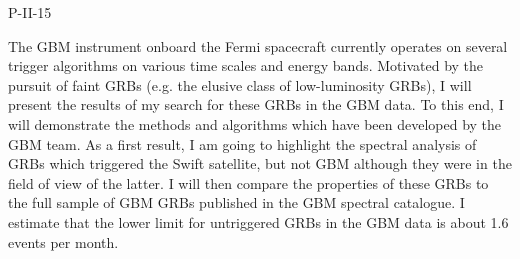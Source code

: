 P-II-15


\bigskip



\bigskip

\noindent The GBM instrument onboard the Fermi spacecraft currently operates on several trigger algorithms on various time scales and energy bands.
Motivated by the pursuit of faint GRBs (e.g. the elusive class of low-luminosity GRBs), I will present the results of my search for these GRBs in the GBM data. To this end, I will demonstrate the methods and algorithms which have been developed by the GBM team.
As a first result, I am going to highlight the spectral analysis of GRBs which triggered the Swift satellite, but not GBM although they were in the field of view of the latter. I will then compare the properties of these GRBs to the full sample of GBM GRBs published in the GBM spectral catalogue.
I estimate that the lower limit for untriggered GRBs in the GBM data is about 1.6 events per month.

